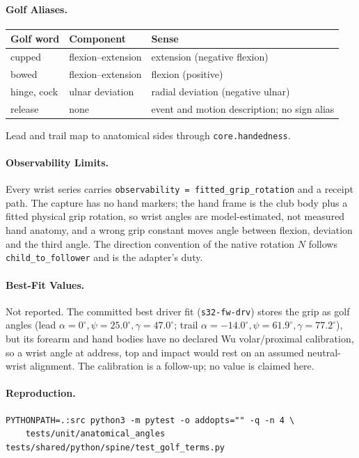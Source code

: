 \documentclass[11pt,a4paper]{article}
\begin{document}
\paragraph{Golf Aliases.}
\begin{center}
\begin{tabular}{lll}
\hline
Golf word & Component & Sense \\
\hline
cupped & flexion--extension & extension (negative flexion) \\
bowed & flexion--extension & flexion (positive) \\
hinge, cock & ulnar deviation & radial deviation (negative ulnar) \\
release & none & event and motion description; no sign alias \\
\hline
\end{tabular}
\end{center}
Lead and trail map to anatomical sides through \texttt{core.handedness}.

\paragraph{Observability Limits.}
Every wrist series carries \texttt{observability = fitted\_grip\_rotation} and a
receipt path. The capture has no hand markers; the hand frame is the club body
plus a fitted physical grip rotation, so wrist angles are model-estimated, not
measured hand anatomy, and a wrong grip constant moves angle between flexion,
deviation and the third angle. The direction convention of the native
rotation $N$ follows \texttt{child\_to\_follower} and is the adapter's duty.

\paragraph{Best-Fit Values.}
Not reported. The committed best driver fit (\texttt{s32-fw-drv}) stores the
grip as golf angles (lead $\alpha=0^\circ,\psi=25.0^\circ,\gamma=47.0^\circ$;
trail $\alpha=-14.0^\circ,\psi=61.9^\circ,\gamma=77.2^\circ$), but its
forearm and hand bodies have no declared Wu volar/proximal calibration, so a
wrist angle at address, top and impact would rest on an assumed neutral-wrist
alignment. The calibration is a follow-up; no value is claimed here.

\paragraph{Reproduction.}
\begin{verbatim}
PYTHONPATH=.:src python3 -m pytest -o addopts="" -q -n 4 \
    tests/unit/anatomical_angles tests/shared/python/spine/test_golf_terms.py
\end{verbatim}
\end{document}
